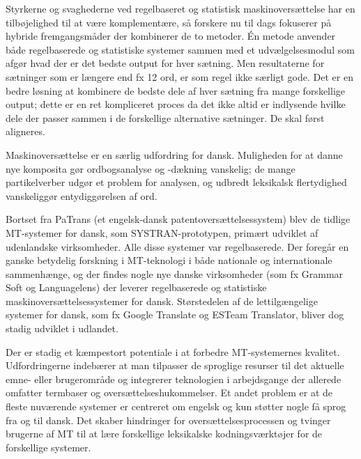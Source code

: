 \begin{multicols}{2}
Styrkerne og svaghederne ved regelbaseret og statistisk maskinovers\ae ttelse har en tilb\o jelighed til at v\ae re komplement\ae re, \mbox{s\aa} forskere nu til dags fokuserer \mbox{p\aa} hybride fremgangsm\aa der der kombinerer de to metoder. \'{E}n metode anvender b\aa de regelbaserede og statistiske systemer sammen med et udv\ae lgelsesmodul som afg\o r hvad der er det bedste output for hver s\ae tning. Men resultaterne for s\ae tninger som er l\ae ngere end fx 12 ord, er som regel ikke s\ae rligt gode. Det er en bedre l\o sning at kombinere de bedste dele af hver s\ae tning fra mange forskellige output; dette er en ret kompliceret proces da det ikke altid er indlysende hvilke dele der passer sammen i de forskellige alternative s\ae tninger. De skal f\o rst aligneres.

Maskinovers\ae ttelse er en s\ae rlig udfordring for dansk. Muligheden for at danne nye komposita g\o r ordbogsanalyse og -d\ae kning vanskelig; de mange partikelverber udg\o r et problem for analysen, og udbredt leksikalsk flertydighed vanskeligg\o r  entydigg\o relsen af ord. 

Bortset fra PaTrans (et engelsk-dansk patentovers\ae ttelsessystem) blev de tidlige MT-systemer for dansk, som SYSTRAN-prototypen, prim\ae rt udviklet af udenlandske virksomheder. Alle disse systemer var regelbaserede. Der foreg\aa r en ganske betydelig forsk\-ning i MT-teknologi i b\aa de nationale og internationale sammenh\ae nge, og der findes nogle nye danske virksomheder (som fx Grammar Soft  og Languagelens) der leverer regelbaserede og statistiske maskinovers\ae ttelsessystemer for dansk. St\o rstedelen af de lettilg\ae ngelige systemer for dansk, som fx Google Translate og ESTeam Translator, bliver dog stadig udviklet i udlandet.


Der er stadig et k\ae mpestort potentiale i at forbedre MT-systemernes kvalitet. Udfordringerne indeb\ae rer at man tilpasser de sproglige resurser til det aktuelle emne- eller brugeromr\aa de og integrerer teknologien i arbejdsgange der allerede omfatter termbaser og overs\ae ttelseshukommelser. Et andet problem er at de fleste nuv\ae rende sy\-stemer er centreret om engelsk og kun st\o tter nogle \mbox{f\aa} sprog fra og til dansk. Det skaber hindringer for overs\ae ttelsesprocessen og tvinger brugerne af MT til at l\ae re forskellige leksikalske kodningsv\ae rkt\o jer for de forskellige systemer. 


\end{multicols}

